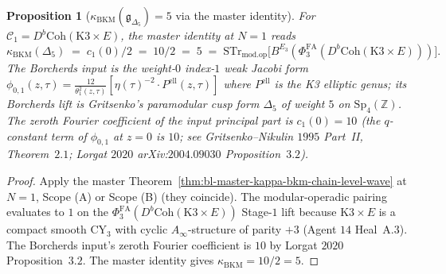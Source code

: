 \documentclass[11pt]{amsart}
\newtheorem{proposition}[theorem]{Proposition}
\providecommand{\Z}{\mathbb{Z}}
\providecommand{\cC}{\mathcal{C}}
\providecommand{\fg}{\mathfrak{g}}
\providecommand{\Sp}{\mathrm{Sp}}
\providecommand{\PhiFA}{\Phi^{\mathrm{FA}}}
\providecommand{\Coh}{\mathrm{Coh}}
\providecommand{\STr}{\mathrm{STr}}
\providecommand{\modop}{\mathrm{mod.op}}
\providecommand{\kBKM}{\kappa_{\mathrm{BKM}}}
\begin{document}
\begin{proposition}[$\kBKM(\fg_{\Delta_5}) = 5$ via the master
identity]
\label{prop:k3xe-master-identity}
For $\cC_1 = D^b\Coh(\mathrm{K3} \times E)$, the master identity
at $N = 1$ reads
\[
 \kBKM(\Delta_5) \;=\; c_1(0)/2 \;=\; 10/2 \;=\; 5
 \;=\; \STr_{\modop}\bigl[B^{E_3}(\PhiFA_3(D^b\Coh(\mathrm{K3} \times E)))\bigr].
\]
The Borcherds input is the weight-$0$ index-$1$ weak Jacobi form
$\phi_{0, 1}(z, \tau) = \frac{12}{\theta_1^2(z, \tau)}[\eta(\tau)^{-2}
\cdot P^{\mathrm{ell}}(z, \tau)]$ where $P^{\mathrm{ell}}$ is the
K3 elliptic genus; its Borcherds lift is Gritsenko's paramodular cusp
form $\Delta_5$ of weight $5$ on $\Sp_4(\Z)$. The zeroth Fourier
coefficient of the input principal part is $c_1(0) = 10$ (the
$q$-constant term of $\phi_{0, 1}$ at $z = 0$ is $10$; see
Gritsenko--Nikulin $1995$ Part~II, Theorem~$2.1$; Lorgat $2020$
arXiv:$2004.09030$ Proposition~$3.2$).
\end{proposition}

\begin{proof}
Apply the master Theorem~\ref{thm:bl-master-kappa-bkm-chain-level-wave}
at $N = 1$, Scope (A) or Scope (B) (they coincide). The
modular-operadic pairing evaluates to $1$ on the
$\PhiFA_3(D^b\Coh(\mathrm{K3} \times E))$ Stage-$1$ lift because
$\mathrm{K3} \times E$ is a compact smooth CY$_3$ with cyclic
$A_\infty$-structure of parity $+3$ (Agent $14$ Heal~A.$3$). The
Borcherds input's zeroth Fourier coefficient is $10$ by Lorgat
$2020$ Proposition~$3.2$. The master identity gives $\kBKM =
10/2 = 5$.
\end{proof}
\end{document}
